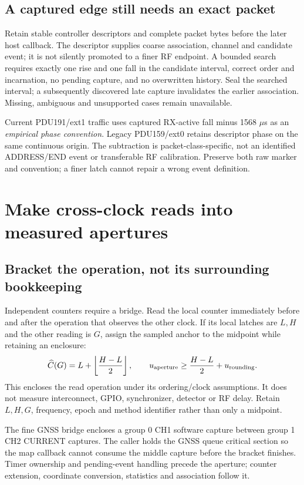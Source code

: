 \documentclass[10pt,letterpaper]{article}
\begin{document}
\subsection{A captured edge still needs an exact packet}
Retain stable controller descriptors and complete packet bytes before the later host callback. The descriptor supplies coarse association, channel and candidate event; it is not silently promoted to a finer RF endpoint. A bounded search requires exactly one rise and one fall in the candidate interval, correct order and incarnation, no pending capture, and no overwritten history. Seal the searched interval; a subsequently discovered late capture invalidates the earlier association. Missing, ambiguous and unsupported cases remain unavailable.

Current PDU191/ext1 traffic uses captured RX-active fall minus 1568 $\mu$s as an \emph{empirical phase convention}. Legacy PDU159/ext0 retains descriptor phase on the same continuous origin. The subtraction is packet-class-specific, not an identified ADDRESS/END event or transferable RF calibration. Preserve both raw marker and convention; a finer latch cannot repair a wrong event definition.
\newpage
\section{Make cross-clock reads into measured apertures}
\subsection{Bracket the operation, not its surrounding bookkeeping}
Independent counters require a bridge. Read the local counter immediately before and after the operation that observes the other clock. If its local latches are $L,H$ and the other reading is $G$, assign the sampled anchor to the midpoint while retaining an enclosure:
\[
 \widehat C(G)=L+\left\lfloor\frac{H-L}{2}\right\rfloor,
 \qquad u_{\rm aperture}\ge\frac{H-L}{2}+u_{\rm rounding}.
\]
This encloses the read operation under its ordering/clock assumptions. It does not measure interconnect, GPIO, synchronizer, detector or RF delay. Retain $L,H,G$, frequency, epoch and method identifier rather than only a midpoint.

The fine GNSS bridge encloses a group 0 CH1 software capture between group 1 CH2 CURRENT captures. The caller holds the GNSS queue critical section so the map callback cannot consume the middle capture before the bracket finishes. Timer ownership and pending-event handling precede the aperture; counter extension, coordinate conversion, statistics and association follow it.
\end{document}
